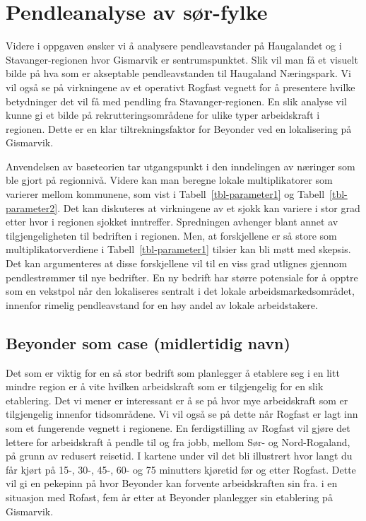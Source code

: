 \documentclass[
]{article}
\begin{document}
\newpage

\hypertarget{pendleanalyse-av-suxf8r-fylke}{%
\section{Pendleanalyse av
sør-fylke}\label{pendleanalyse-av-suxf8r-fylke}}

Videre i oppgaven ønsker vi å analysere pendleavstander på Haugalandet
og i Stavanger-regionen hvor Gismarvik er sentrumspunktet. Slik vil man
få et visuelt bilde på hva som er akseptable pendleavstanden til
Haugaland Næringspark. Vi vil også se på virkningene av et operativt
Rogfast vegnett for å presentere hvilke betydninger det vil få med
pendling fra Stavanger-regionen. En slik analyse vil kunne gi et bilde
på rekrutteringsområdene for ulike typer arbeidskraft i regionen. Dette
er en klar tiltrekningsfaktor for Beyonder ved en lokalisering på
Gismarvik.

Anvendelsen av baseteorien tar utgangspunkt i den inndelingen av
næringer som ble gjort på regionnivå. Videre kan man beregne lokale
multiplikatorer som varierer mellom kommunene, som vist i
Tabell~\ref{tbl-parameter1} og Tabell~\ref{tbl-parameter2}. Det kan
diskuteres at virkningene av et sjokk kan variere i stor grad etter hvor
i regionen sjokket inntreffer. Spredningen avhenger blant annet av
tilgjengeligheten til bedriften i regionen. Men, at forskjellene er så
store som multiplikatorverdiene i Tabell~\ref{tbl-parameter1} tilsier
kan bli møtt med skepsis. Det kan argumenteres at disse forskjellene vil
til en viss grad utlignes gjennom pendlestrømmer til nye bedrifter. En
ny bedrift har større potensiale for å opptre som en vekstpol når den
lokaliseres sentralt i det lokale arbeidsmarkedsområdet, innenfor
rimelig pendleavstand for en høy andel av lokale arbeidstakere.

\hypertarget{beyonder-som-case-midlertidig-navn}{%
\subsection{Beyonder som case (midlertidig
navn)}\label{beyonder-som-case-midlertidig-navn}}

Det som er viktig for en så stor bedrift som planlegger å etablere seg i
en litt mindre region er å vite hvilken arbeidskraft som er tilgjengelig
for en slik etablering. Det vi mener er interessant er å se på hvor mye
arbeidskraft som er tilgjengelig innenfor tidsområdene. Vi vil også se
på dette når Rogfast er lagt inn som et fungerende vegnett i regionene.
En ferdigstilling av Rogfast vil gjøre det lettere for arbeidskraft å
pendle til og fra jobb, mellom Sør- og Nord-Rogaland, på grunn av
redusert reisetid. I kartene under vil det bli illustrert hvor langt du
får kjørt på 15-, 30-, 45-, 60- og 75 minutters kjøretid før og etter
Rogfast. Dette vil gi en pekepinn på hvor Beyonder kan forvente
arbeidskraften sin fra. i en situasjon med Rofast, fem år etter at
Beyonder planlegger sin etablering på Gismarvik.
\end{document}
